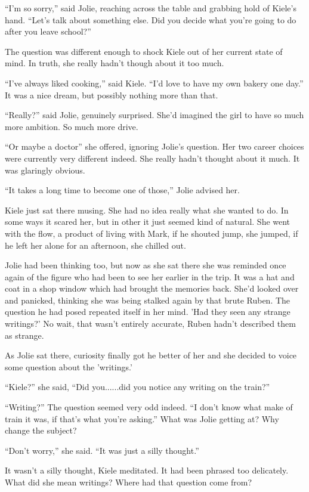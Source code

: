 ``I'm so sorry,'' said Jolie, reaching across the table and grabbing hold of Kiele's hand.  ``Let's talk about something else.  Did you decide what you're going to do after you leave school?''

The question was different enough to shock Kiele out of her current state of mind.  In truth, she really hadn't though about it too much.  

``I've always liked cooking,'' said Kiele.  ``I'd love to have my own bakery one day.''  It was a nice dream, but possibly nothing more than that.  

``Really?'' said Jolie, genuinely surprised.  She'd imagined the girl to have so much more ambition.  So much more drive.

``Or maybe a doctor'' she offered, ignoring Jolie's question.  Her two career choices were currently very different indeed.  She really hadn't thought about it much.  It was glaringly obvious.

``It takes a long time to become one of those,'' Jolie advised her.  

Kiele just sat there musing.  She had no idea really what she wanted to do.  In some ways it scared her, but in other it just seemed kind of natural.  She went with the flow, a product of living with Mark, if he shouted jump, she jumped, if he left her alone for an afternoon, she chilled out.  

Jolie had been thinking too, but now as she sat there she was reminded once again of the figure who had been to see her earlier in the trip.  It was a hat and coat in a shop window which had brought the memories back.  She'd looked over and panicked, thinking she was being stalked again by that brute Ruben.  The question he had posed repeated itself in her mind.  'Had they seen any strange writings?'  No wait, that wasn't entirely accurate, Ruben hadn't described them as strange.  

As Jolie sat there, curiosity finally got he better of her and she decided to voice some question about the 'writings.'

``Kiele?'' she said, ``Did you......did you notice any writing on the train?''  

``Writing?''  The question seemed very odd indeed.  ``I don't know what make of train it was, if that's what you're asking.''  What was Jolie getting at?  Why change the subject?

``Don't worry,'' she said.  ``It was just a silly thought.''

It wasn't a silly thought, Kiele meditated.  It had been phrased too delicately.  What did she mean writings?  Where had that question come from?







